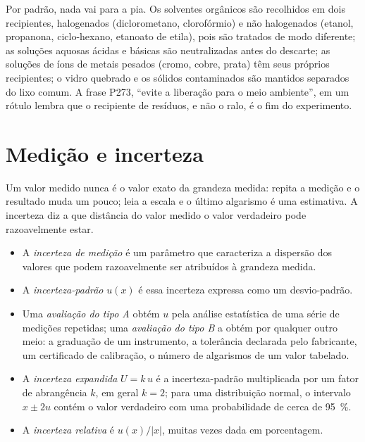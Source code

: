 \begin{inthelab}[Resíduos]
Por padrão, nada vai para a pia. Os solventes orgânicos são recolhidos em
dois recipientes, halogenados (diclorometano, clorofórmio) e não
halogenados (etanol, propanona, ciclo-hexano, etanoato de etila), pois são
tratados de modo diferente; as soluções aquosas ácidas e básicas são
neutralizadas antes do descarte; as soluções de íons de metais pesados
(cromo, cobre, prata) têm seus próprios recipientes; o vidro quebrado e os
sólidos contaminados são mantidos separados do lixo comum. A frase P273,
``evite a liberação para o meio ambiente'', em um rótulo lembra que o
recipiente de resíduos, e não o ralo, é o fim do experimento.
\end{inthelab}

\section{Medição e incerteza}

Um valor medido nunca é o valor exato da grandeza medida: repita a medição
e o resultado muda um pouco; leia a escala e o último algarismo é uma
estimativa. A incerteza diz a que distância do valor medido o valor
verdadeiro pode razoavelmente estar.

\begin{definition}\label{def:b1:lab-techniques-1:uncertainty}
\begin{itemize}
  \item A \emph{incerteza de medição}
        é um parâmetro que caracteriza a dispersão dos valores que podem
        razoavelmente ser atribuídos à grandeza medida.
  \item A \emph{incerteza-padrão} $u(x)$
        é essa incerteza expressa como um desvio-padrão.
  \item Uma \emph{avaliação do tipo A} obtém $u$
        pela análise estatística de uma série de medições repetidas; uma
        \emph{avaliação do tipo B} a obtém por
        qualquer outro meio: a graduação de um instrumento, a tolerância
        declarada pelo fabricante, um certificado de calibração, o número
        de algarismos de um valor tabelado.
  \item A \emph{incerteza expandida}
        $U = k\,u$ é a incerteza-padrão multiplicada por um fator de
        abrangência $k$, em geral $k = 2$; para uma distribuição normal, o
        intervalo $x \pm 2u$ contém o valor verdadeiro com uma probabilidade
        de cerca de \qty{95}{\percent}.
  \item A \emph{incerteza relativa} é
        $u(x)/|x|$, muitas vezes dada em porcentagem.
\end{itemize}
\end{definition}

